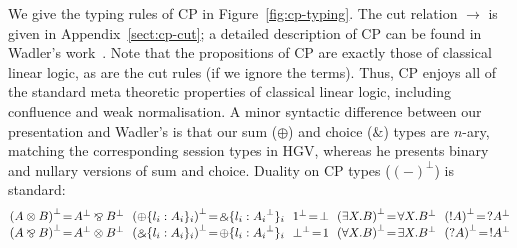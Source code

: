 \documentclass{easychair}
\makeatletter
\newcommand{\ba}{\begin{array}}
\newcommand{\ea}{\end{array}}
\newcommand{\bl}{\ba{@{}c@{}}}
\newcommand{\el}{\ea}
\newcommand{\set}[1]{\{ #1 \}}
\newcommand{\row}[2]{\set{#1}_{#2}}
\newcommand{\la}{l}
\newcommand{\cpTimes}[2]{{#1} \otimes {#2}}
\newcommand{\cpPar}[2]{{#1} \mathbin{\bindnasrepma} {#2}}
\newcommand{\cpPlus}[2]{\oplus \row{#1}{#2}}
\newcommand{\cpWith}[2]{\binampersand \row{#1}{#2}}
\newcommand{\cpOne}{1}
\newcommand{\cpBottom}{\bot}
\newcommand{\cpOfCourse}[1]{\mathord{!}{#1}}
\newcommand{\cpWhyNot}[1]{\mathord{?}{#1}}
\newcommand{\cpDual}[1]{{#1}^\bot}
\newcommand{\cpExists}[2]{\exists {#1}.{#2}}
\newcommand{\cpForall}[2]{\forall {#1}.{#2}}
\newcommand{\hgv}{HGV\xspace}
\newcommand{\redto}{\longrightarrow}
\makeatother
\begin{document}
We give the typing rules of CP in Figure~\ref{fig:cp-typing}. The cut relation $\redto$ is given in
Appendix~\ref{sect:cp-cut}; a detailed description of CP can be found in Wadler's
work~\cite{Wadler12}.  Note that the propositions of CP are exactly those of classical linear logic,
as are the cut rules (if we ignore the terms). Thus, CP enjoys all of the standard meta theoretic
properties of classical linear logic, including confluence and weak normalisation.
%
A minor syntactic difference between our presentation and Wadler's is that our sum ($\oplus$) and
choice ($\binampersand$) types are $n$-ary, matching the corresponding session types in \hgv,
whereas he presents binary and nullary versions of sum and choice.
%
Duality on CP types ($\cpDual{(-)}$) is standard:
\[
\bl
  \cpDual{(\cpTimes{A}{B})} \!=\! \cpPar{\cpDual{A}}{\cpDual{B}}
~~
  \cpDual{(\cpPlus{\la_i:A_i}{i})} \!=\! \cpWith{\la_i:\cpDual{A_i}}{i}
~~
  \cpDual{\cpOne} \!=\! \cpBottom
~~
  \cpDual{(\cpExists{X}{B})} \!=\! \cpForall{X}{\cpDual{B}}
~~
  \cpDual{(\cpOfCourse{A})} \!=\! \cpWhyNot{\cpDual{A}}
\\
  \cpDual{(\cpPar{A}{B})} \!=\! \cpTimes{\cpDual{A}}{\cpDual{B}}
~~
  \cpDual{(\cpWith{\la_i:A_i}{i})} \!=\! \cpPlus{\la_i:\cpDual{A_i}}{i}
~~
  \cpDual{\cpBottom} \!=\! \cpOne
~~
  \cpDual{(\cpForall{X}{B})} \!=\! \cpExists{X}{\cpDual{B}}
~~
  \cpDual{(\cpWhyNot{A})} \!=\! \cpOfCourse{\cpDual{A}}
\\
\el
\]
\end{document}
